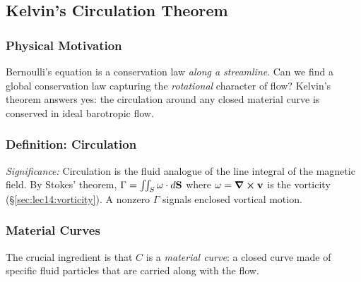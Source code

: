 \documentclass[../main.tex]{subfiles}
\begin{document}
\subsection{Kelvin's Circulation Theorem}\label{sec:lec14:kelvin}

\subsubsection*{Physical Motivation}
Bernoulli's equation is a conservation law \emph{along a streamline}. Can we find a global conservation law capturing the \emph{rotational} character of flow? Kelvin's theorem answers yes: the circulation around any closed material curve is conserved in ideal barotropic flow.

\subsubsection{Definition: Circulation}

\textit{Significance:} Circulation is the fluid analogue of the line integral of the magnetic field. By Stokes' theorem, $\Gamma = \iint_S\mathbf{\omega}\cdot d\mathbf{S}$ where $\mathbf{\omega}=\curl\mathbf{v}$ is the vorticity (\S\ref{sec:lec14:vorticity}). A nonzero $\Gamma$ signals enclosed vortical motion.

\subsubsection{Material Curves}

The crucial ingredient is that $C$ is a \emph{material curve}: a closed curve made of specific fluid particles that are carried along with the flow.
\end{document}
